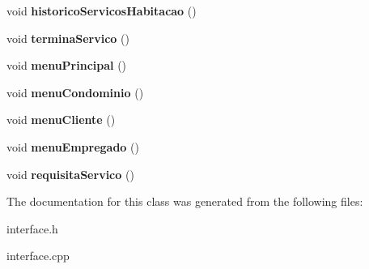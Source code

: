 \begin{DoxyCompactItemize}
\item 
void {\bfseries historico\+Servicos\+Habitacao} ()\hypertarget{class_interface_a9c249ee70e15d13ceaa4b88b7e2ad4d2}{}\label{class_interface_a9c249ee70e15d13ceaa4b88b7e2ad4d2}

\item 
void {\bfseries termina\+Servico} ()\hypertarget{class_interface_a4a258bbbcf8d46cf0301bb8ca1792966}{}\label{class_interface_a4a258bbbcf8d46cf0301bb8ca1792966}

\item 
void {\bfseries menu\+Principal} ()\hypertarget{class_interface_a417dd813f30bf427f6dd1fe57887a685}{}\label{class_interface_a417dd813f30bf427f6dd1fe57887a685}

\item 
void {\bfseries menu\+Condominio} ()\hypertarget{class_interface_a29d77218d33dab2c23a6c064b5f699db}{}\label{class_interface_a29d77218d33dab2c23a6c064b5f699db}

\item 
void {\bfseries menu\+Cliente} ()\hypertarget{class_interface_a9df9a75b68cd5009f39ff1ae9683d371}{}\label{class_interface_a9df9a75b68cd5009f39ff1ae9683d371}

\item 
void {\bfseries menu\+Empregado} ()\hypertarget{class_interface_a6921af8d7a2a51836bec16fd5f892db3}{}\label{class_interface_a6921af8d7a2a51836bec16fd5f892db3}

\item 
void {\bfseries requisita\+Servico} ()\hypertarget{class_interface_a1cd911a367d92b2ef9a1c2b05fadf5d7}{}\label{class_interface_a1cd911a367d92b2ef9a1c2b05fadf5d7}

\end{DoxyCompactItemize}


The documentation for this class was generated from the following files\+:\begin{DoxyCompactItemize}
\item 
interface.\+h\item 
interface.\+cpp\end{DoxyCompactItemize}
